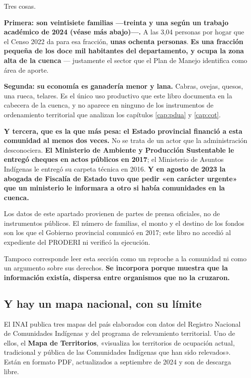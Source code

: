 Tres cosas.

\textbf{Primera: son veintisiete familias ---treinta y una según un trabajo académico de 2024 (véase más abajo)---.} A las 3,04 personas por hogar que el Censo 2022 da para esa fracción, \textbf{unas ochenta personas}. \textbf{Es una fracción pequeña de los doce mil
habitantes del departamento, y ocupa la zona alta de la cuenca} --- justamente el sector que
el Plan de Manejo identifica como área de aporte.

\textbf{Segunda: su economía es ganadería menor y lana.} Cabras, ovejas, quesos, una rueca,
telares. Es el único uso productivo que este libro documenta en la cabecera de la cuenca, y no
aparece en ninguno de los instrumentos de ordenamiento territorial que analizan los capítulos \ref{cap:pdua} y \ref{cap:cot}.

\textbf{Y tercera, que es la que más pesa: el Estado provincial financió a esta comunidad al
menos dos veces.} No se trata de un actor que la administración desconociera. \textbf{El
Ministerio de Ambiente y Producción Sustentable le entregó cheques en actos públicos en 2017};
el Ministerio de Asuntos Indígenas le entregó su carpeta técnica en 2016. \textbf{Y en agosto
de 2023 la abogada de Fiscalía de Estado tuvo que pedir «en carácter urgente» que un ministerio
le informara a otro si había comunidades en la cuenca.}

\begin{cautela}
Los datos de este apartado provienen de partes de prensa oficiales, no de instrumentos
públicos. El número de familias, el monto y el destino de los fondos son los que el Gobierno
provincial comunicó en 2017; este libro no accedió al expediente del PRODERI ni verificó la
ejecución.

Tampoco corresponde leer esta sección como un reproche a la comunidad ni como un argumento
sobre sus derechos. \textbf{Se incorpora porque muestra que la información existía, dispersa
entre organismos que no la cruzaron.}
\end{cautela}

\subsection*{Y hay un mapa nacional, con su límite}

El INAI publica tres mapas del país elaborados con datos del Registro Nacional de Comunidades
Indígenas y del programa de relevamiento territorial. Uno de ellos, el \textbf{Mapa de
Territorios}, «visualiza los territorios de ocupación actual, tradicional y pública de las
Comunidades Indígenas que han sido relevados». Están en formato PDF, actualizados a septiembre
de 2024 y son de descarga libre.

